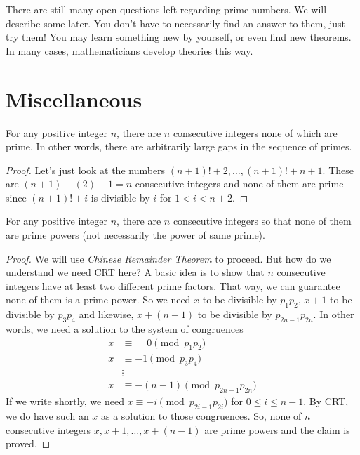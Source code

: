 \documentclass{subfiles}
\begin{document}
	
	There are still many open questions left regarding prime numbers. We will describe some later. You don't have to necessarily find an answer to them, just try them! You may learn something new by yourself, or even find new theorems. In many cases, mathematicians develop theories this way.

	\section{Miscellaneous}
	\label{sec:theoremsinprimes}

	\begin{theorem}
		For any positive integer $n$, there are $n$ consecutive integers none of which are prime. In other words, there are arbitrarily large gaps in the sequence of primes.
	\end{theorem}

	\begin{proof}
		Let's just look at the numbers $(n+1)!+2,\ldots,(n+1)!+n+1$. These are $(n+1)-(2)+1=n$ consecutive integers and none of them are prime since $(n+1)!+i$ is divisible by $i$ for $1<i<n+2$.
	\end{proof}

	\begin{theorem}
		For any positive integer $n$, there are $n$ consecutive integers so that none of them are prime powers (not necessarily the power of same prime).
	\end{theorem}

	\begin{proof}
		We will use \textit{Chinese Remainder Theorem} to proceed. But how do we understand we need CRT here? A basic idea is to show that $n$ consecutive integers have at least two different prime factors. That way, we can guarantee none of them is a prime power. So we need $x$ to be divisible by $p_1p_2$, $x+1$ to be divisible by $p_3p_4$ and likewise, $x+(n-1)$ to be divisible by $p_{2n-1}p_{2n}$. In other words, we need a solution to the system of congruences
			\begin{align*}
				x & \equiv \phantom{-} 0  \pmod {p_1p_2}\\
				x & \equiv -1  \pmod{p_3p_4}\\
				  &  \vdots \\
				x & \equiv -(n-1) \pmod{p_{2n-1}p_{2n}}
			\end{align*}
		If we write shortly, we need $x\equiv-i\pmod{p_{2i-1}p_{2i}}$ for $0\leq i\leq n-1$. By CRT, we do have such an $x$ as a solution to those congruences. So, none of $n$ consecutive integers $x, x+1, \ldots, x+(n-1)$ are prime powers and the claim is proved.
	\end{proof}
\end{document}
